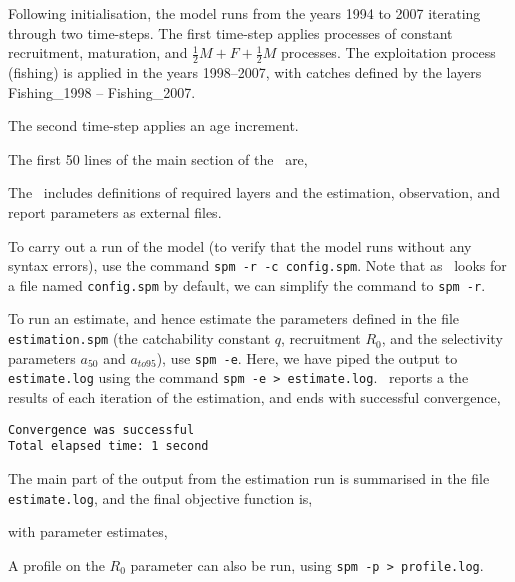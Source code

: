 Following initialisation, the model runs from the years 1994 to 2007 iterating through two time-steps. The first time-step applies processes of constant recruitment, maturation, and  $\frac{1}{2} M + F + \frac{1}{2} M$ processes. The exploitation process (fishing) is applied in the years 1998--2007, with catches defined by the layers Fishing\_1998 -- Fishing\_2007. 

The second time-step applies an age increment.

The first 50 lines of the main section of the \config\ are,
 

The \config\ includes definitions of required layers and the estimation, observation, and report parameters as external files.

To carry out a run of the model (to verify that the model runs without any syntax errors), use the command \texttt{spm -r -c config.spm}. Note that as \SPM\ looks for a file named \texttt{config.spm} by default, we can simplify the command to \texttt{spm -r}. 

To run an estimate, and hence estimate the parameters defined in the file \texttt{estimation.spm} (the catchability constant $q$, recruitment $R_0$, and the selectivity parameters $a_{50}$ and $a_{to95}$), use  \texttt{spm -e}. Here, we have piped the output to \texttt{estimate.log} using the command \texttt{spm -e > estimate.log}.  \SPM\ reports a the results of each iteration of the estimation, and ends with successful convergence,
{\small{\begin{verbatim}
Convergence was successful
Total elapsed time: 1 second
\end{verbatim}}}

The main part of the output from the estimation run is summarised in the file \texttt{estimate.log}, and the final objective function is,
 
with parameter estimates,
 

A profile on the $R_0$ parameter can also be run, using \texttt{spm -p > profile.log}.
